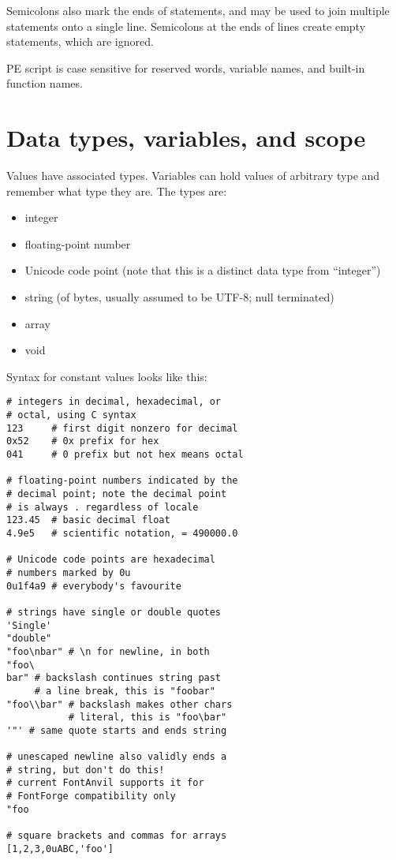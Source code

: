 Semicolons also mark the ends of statements, and may be used to join
multiple statements onto a single line.  Semicolons at the ends of lines
create empty statements, which are ignored.

\begin{framed}
PE script is case sensitive for reserved words, variable names,
and built-in function names.
\end{framed}

\section{Data types, variables, and scope}

Values have associated types.  Variables can hold values of arbitrary type
and remember what type they are.  The types are:
\begin{itemize}
\item integer
\item floating-point number
\item Unicode code point (note that this is a distinct data type from
``integer'')
\item string (of bytes, usually assumed to be UTF-8; null terminated)
\item array
\item void
\end{itemize}

Syntax for constant values looks like this:
\begin{verbatim}
# integers in decimal, hexadecimal, or
# octal, using C syntax
123     # first digit nonzero for decimal
0x52    # 0x prefix for hex
041     # 0 prefix but not hex means octal

# floating-point numbers indicated by the
# decimal point; note the decimal point
# is always . regardless of locale
123.45  # basic decimal float
4.9e5   # scientific notation, = 490000.0

# Unicode code points are hexadecimal
# numbers marked by 0u
0u1f4a9 # everybody's favourite

# strings have single or double quotes
'Single'
"double"
"foo\nbar" # \n for newline, in both
"foo\
bar" # backslash continues string past
     # a line break, this is "foobar"
"foo\\bar" # backslash makes other chars
           # literal, this is "foo\bar" 
'"' # same quote starts and ends string

# unescaped newline also validly ends a
# string, but don't do this!
# current FontAnvil supports it for
# FontForge compatibility only
"foo

# square brackets and commas for arrays
[1,2,3,0uABC,'foo']
\end{verbatim}

